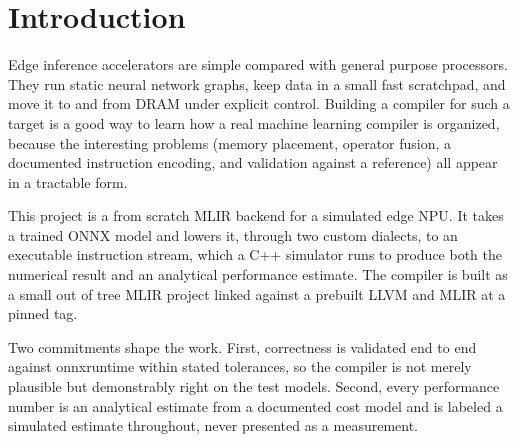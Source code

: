 \section{Introduction}

Edge inference accelerators are simple compared with general purpose processors.
They run static neural network graphs, keep data in a small fast scratchpad, and
move it to and from DRAM under explicit control. Building a compiler for such a
target is a good way to learn how a real machine learning compiler is organized,
because the interesting problems (memory placement, operator fusion, a documented
instruction encoding, and validation against a reference) all appear in a
tractable form.

This project is a from scratch MLIR backend for a simulated edge NPU. It takes a
trained ONNX model and lowers it, through two custom dialects, to an executable
instruction stream, which a C++ simulator runs to produce both the numerical
result and an analytical performance estimate. The compiler is built as a small
out of tree MLIR project linked against a prebuilt LLVM and MLIR at a pinned tag.

Two commitments shape the work. First, correctness is validated end to end against
onnxruntime within stated tolerances, so the compiler is not merely plausible but
demonstrably right on the test models. Second, every performance number is an
analytical estimate from a documented cost model and is labeled a simulated
estimate throughout, never presented as a measurement.
